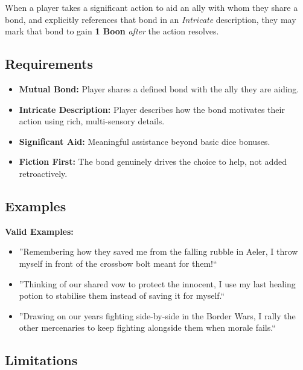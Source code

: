 When a player takes a significant action to aid an ally with whom they share a bond, and explicitly references that bond in an \emph{Intricate} description, they may mark that bond to gain \textbf{1 Boon} \emph{after} the action resolves.

\subsection{Requirements}\label{subsec:bond_requirements}

\begin{itemize}
    \item \textbf{Mutual Bond:} Player shares a defined bond with the ally they are aiding.
    \item \textbf{Intricate Description:} Player describes how the bond motivates their action using rich, multi-sensory details.
    \item \textbf{Significant Aid:} Meaningful assistance beyond basic dice bonuses.
    \item \textbf{Fiction First:} The bond genuinely drives the choice to help, not added retroactively.
\end{itemize}

\subsection{Examples}\label{subsec:bond_examples}

\textbf{Valid Examples:}
\begin{itemize}
    \item ''Remembering how they saved me from the falling rubble in Aeler, I throw myself in front of the crossbow bolt meant for them!``
    \item ''Thinking of our shared vow to protect the innocent, I use my last healing potion to stabilise them instead of saving it for myself.``
    \item ''Drawing on our years fighting side-by-side in the Border Wars, I rally the other mercenaries to keep fighting alongside them when morale fails.``
\end{itemize}

\subsection{Limitations}\label{subsec:bond_limitations}

